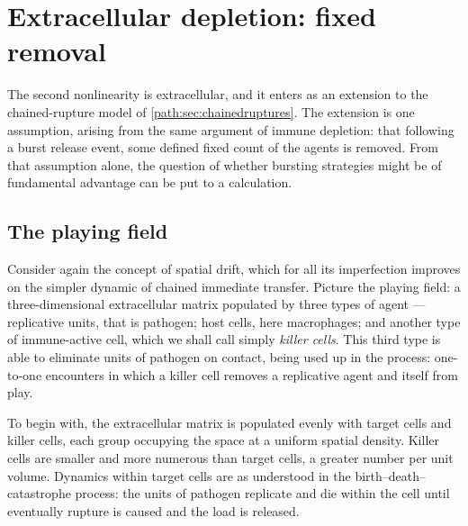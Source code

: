 %

\section{Extracellular depletion: fixed removal}
\label{path:sec:removal}

The second nonlinearity is extracellular, and it enters as an extension to
the chained-rupture model of \cref{path:sec:chainedruptures}. The extension
is one assumption, arising from the same argument of immune depletion: that
following a burst release event, some defined fixed count of the agents is
removed. From that assumption alone, the question of whether bursting
strategies might be of fundamental advantage can be put to a calculation.

\subsection{The playing field}
\label{path:sec:playingfield}

Consider again the concept of spatial drift, which for all its imperfection
improves on the simpler dynamic of chained immediate transfer. Picture the
playing field: a three-dimensional extracellular matrix populated by three
types of agent --- replicative units, that is pathogen; host cells, here
macrophages; and another type of immune-active cell, which we shall call
simply \emph{killer cells}. This third type is able to eliminate units of
pathogen on contact, being used up in the process: one-to-one encounters in
which a killer cell removes a replicative agent and itself from play.

To begin with, the extracellular matrix is populated evenly with target
cells and killer cells, each group occupying the space at a uniform spatial
density. Killer cells are smaller and more numerous than target cells, a
greater number per unit volume. Dynamics within target cells are as
understood in the birth--death--catastrophe process: the units of pathogen
replicate and die within the cell until eventually rupture is caused and the
load is released.

